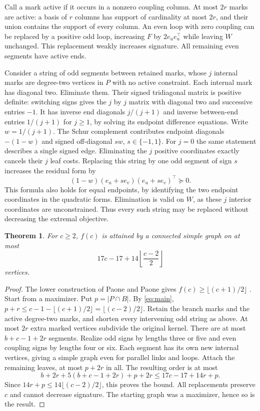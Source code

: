 \documentclass[11pt]{article}
\newtheorem{theorem}{Theorem}[section]
\begin{document}
Call a mark active if it occurs in a nonzero coupling column. At most $2r$ marks are active: a basis of $r$ columns has support of cardinality at most $2r$, and their union contains the support of every column. An even loop with zero coupling can be replaced by a positive odd loop, increasing $F$ by $2e_ue_u^\top$ while leaving $W$ unchanged. This replacement weakly increases signature. All remaining even segments have active ends.

Consider a string of odd segments between retained marks, whose $j$ internal marks are degree-two vertices in $P$ with no active constraint. Each internal mark has diagonal two. Eliminate them. Their signed tridiagonal matrix is positive definite: switching signs gives the $j$ by $j$ matrix with diagonal two and successive entries $-1$. It has inverse end diagonals $j/(j+1)$ and inverse between-end entries $1/(j+1)$ for $j\ge1$, by solving its endpoint difference equations. Write $w=1/(j+1)$. The Schur complement contributes endpoint diagonals $-(1-w)$ and signed off-diagonal $s w$, $s\in\{-1,1\}$. For $j=0$ the same statement describes a single signed edge. Eliminating the $j$ positive coordinates exactly cancels their $j$ leaf costs. Replacing this string by one odd segment of sign $s$ increases the residual form by
\[
 (1-w)(e_u+s e_v)(e_u+s e_v)^\top\succeq0.
\]
This formula also holds for equal endpoints, by identifying the two endpoint coordinates in the quadratic forms. Elimination is valid on $W$, as these $j$ interior coordinates are unconstrained. Thus every such string may be replaced without decreasing the extremal objective.

\begin{theorem}\label{th:finite}
For $c\ge2$, $f(c)$ is attained by a connected simple graph on at most
\[
17c-17+14\left\lfloor\frac{c-2}{2}\right\rfloor
\]
vertices.
\end{theorem}
\begin{proof}
The lower construction of Paone and Paone gives $f(c)\ge\lfloor(c+1)/2\rfloor$ \cite[Theorem 5.3]{pp}. Start from a maximizer. Put $p=|P\cap B|$. By \eqref{eq:main}, $p+r\le c-1-\lfloor(c+1)/2\rfloor=\lfloor(c-2)/2\rfloor$. Retain the branch marks and the active degree-two marks, and shorten every intervening odd string as above. At most $2r$ extra marked vertices subdivide the original kernel. There are at most $b+c-1+2r$ segments. Realize odd signs by lengths three or five and even coupling signs by lengths four or six. Each segment has its own new internal vertices, giving a simple graph even for parallel links and loops. Attach the remaining leaves, at most $p+2r$ in all. The resulting order is at most
\[
 b+2r+5(b+c-1+2r)+p+2r
 \le17c-17+14r+p.
\]
Since $14r+p\le14\lfloor(c-2)/2\rfloor$, this proves the bound. All replacements preserve $c$ and cannot decrease signature. The starting graph was a maximizer, hence so is the result.
\end{proof}
\end{document}
